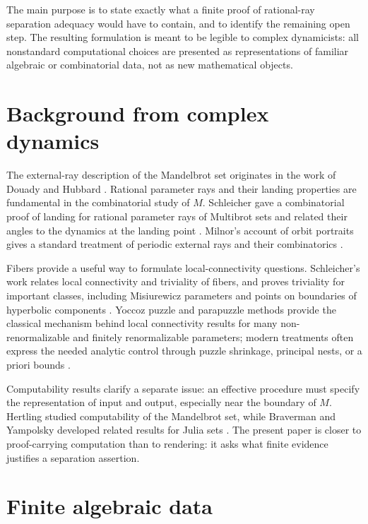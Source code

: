 \documentclass[11pt]{amsart}
\begin{document}
The main purpose is to state exactly what a finite proof of rational-ray separation adequacy would have to contain, and to identify the remaining open step.  The resulting formulation is meant to be legible to complex dynamicists: all nonstandard computational choices are presented as representations of familiar algebraic or combinatorial data, not as new mathematical objects.

\section{Background from complex dynamics}

The external-ray description of the Mandelbrot set originates in the work of Douady and Hubbard \cite{DouadyHubbardEtude}.  Rational parameter rays and their landing properties are fundamental in the combinatorial study of \(M\).  Schleicher gave a combinatorial proof of landing for rational parameter rays of Multibrot sets and related their angles to the dynamics at the landing point \cite{SchleicherRationalParameterRays}.  Milnor's account of orbit portraits gives a standard treatment of periodic external rays and their combinatorics \cite{MilnorOrbitPortraits}.

Fibers provide a useful way to formulate local-connectivity questions.  Schleicher's work relates local connectivity and triviality of fibers, and proves triviality for important classes, including Misiurewicz parameters and points on boundaries of hyperbolic components \cite{SchleicherFibersLC,SchleicherFibersRenormalization}.  Yoccoz puzzle and parapuzzle methods provide the classical mechanism behind local connectivity results for many non-renormalizable and finitely renormalizable parameters; modern treatments often express the needed analytic control through puzzle shrinkage, principal nests, or a priori bounds \cite{LyubichMilnorSullivan,AKLSUnicriticalLC}.

Computability results clarify a separate issue: an effective procedure must specify the representation of input and output, especially near the boundary of \(M\).  Hertling studied computability of the Mandelbrot set, while Braverman and Yampolsky developed related results for Julia sets \cite{HertlingMandelbrotComputable,BravermanYampolskyJuliaComputability}.  The present paper is closer to proof-carrying computation than to rendering: it asks what finite evidence justifies a separation assertion.

\section{Finite algebraic data}
\end{document}
